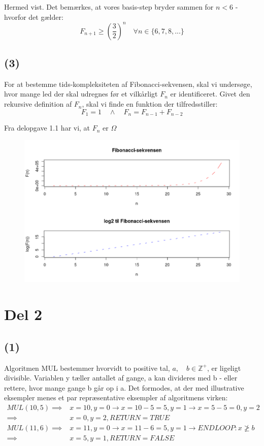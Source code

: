 \documentclass[a4paper,10pt]{article}
\begin{document}
Hermed vist. Det bemærkes, at vores basis-step bryder sammen for $n < 6$ - hvorfor det gælder:
$$
F_{n+1} \geq (\frac{3}{2})^{n} \quad \forall n \in \{6, 7, 8,...\}
$$

\subsection*{(3)}

For at bestemme tids-kompleksiteten af Fibonacci-sekvensen, skal vi undersøge, hvor mange led der skal udregnes før et vilkårligt $F_{n}$ er identificeret. Givet den rekursive definition af $F_{n}$, skal vi finde en funktion der tilfredsstiller:
$$
F_{1} = 1 \quad \wedge \quad
F_{n} = F_{n-1} + F_{n-2}
$$

Fra delopgave 1.1 har vi, at $F_{n}$ er $\Omega$

\begin{figure}[H]
\centering
\includegraphics[scale = 0.5]{fibSeq.png}
\end{figure}

\section*{Del 2}
\subsection*{(1)}
Algoritmen MUL bestemmer hvorvidt to positive tal, $a,\quad b \in \mathbb Z^{+}$, er ligeligt divisible. Variablen y tæller antallet af gange, a kan divideres med b - eller rettere, hvor mange gange b går op i a. Det formodes, at der med illustrative eksempler menes et par repræsentative eksempler af algoritmens virken:
\begin{equation}
\begin{aligned}	
MUL(10, 5)		\implies	& x = 10, y = 0 \rightarrow x = 10-5 = 5, y = 1 \rightarrow  x = 5-5 = 0, y = 2 \\
				\implies	& x = 0, y = 2, RETURN = TRUE \\
MUL(11, 6)		\implies 	& x = 11, y = 0 \rightarrow  x = 11-6 = 5, y = 1 \rightarrow END LOOP: x \ngeq b \\
				\implies	& x = 5, y = 1, RETURN = FALSE
\end{aligned}
\end{equation}
\end{document}
